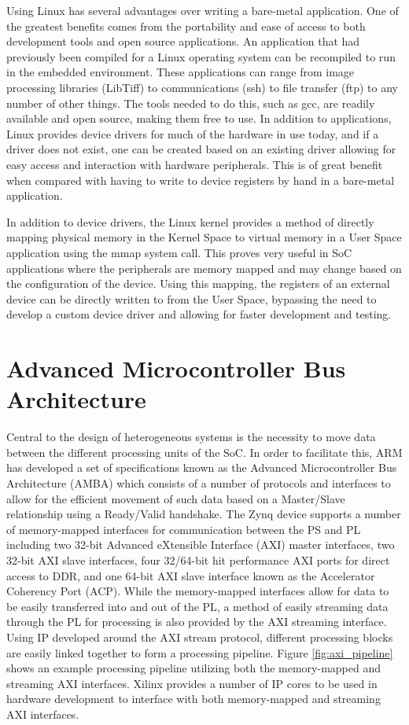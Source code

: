 Using Linux has several advantages over writing a bare-metal application.  One of the greatest benefits comes from the portability and ease of access to both development tools and open source applications.  An application that had previously been compiled for a Linux operating system can be recompiled to run in the embedded environment.  These applications can range from image processing libraries (LibTiff) to communications (ssh) to file transfer (ftp) to any number of other things.  The tools needed to do this, such as gcc, are readily available and open source, making them free to use.  In addition to applications, Linux provides device drivers for much of the hardware in use today, and if a driver does not exist, one can be created based on an existing driver allowing for easy access and interaction with hardware peripherals.  This is of great benefit when compared with having to write to device registers by hand in a bare-metal application.

In addition to device drivers, the Linux kernel provides a method of directly mapping physical memory in the Kernel Space to virtual memory in a User Space application using the mmap system call.  This proves very useful in SoC applications where the peripherals are memory mapped and may change based on the configuration of the device.  Using this mapping, the registers of an external device can be directly written to from the User Space, bypassing the need to develop a custom device driver and allowing for faster development and testing.

\section{Advanced Microcontroller Bus Architecture}
Central to the design of heterogeneous systems is the necessity to move data between the different processing units of the SoC.  In order to facilitate this, ARM has developed a set of specifications known as the Advanced Microcontroller Bus Architecture (AMBA) which consists of a number of protocols and interfaces to allow for the efficient movement of such data based on a Master/Slave relationship using a Ready/Valid handshake.  The Zynq device supports a number of memory-mapped interfaces for communication between the PS and PL including two 32-bit Advanced eXtensible Interface (AXI) master interfaces, two 32-bit AXI slave interfaces, four 32/64-bit hit performance AXI ports for direct access to DDR, and one 64-bit AXI slave interface known as the Accelerator Coherency Port (ACP).  While the memory-mapped interfaces allow for data to be easily transferred into and out of the PL, a method of easily streaming data through the PL for processing is also provided by the AXI streaming interface.  Using IP developed around the AXI stream protocol, different processing blocks are easily linked together to form a processing pipeline.  Figure \ref{fig:axi_pipeline} shows an example processing pipeline utilizing both the memory-mapped and streaming AXI interfaces.  Xilinx provides a number of IP cores to be used in hardware development to interface with both memory-mapped and streaming AXI interfaces.

